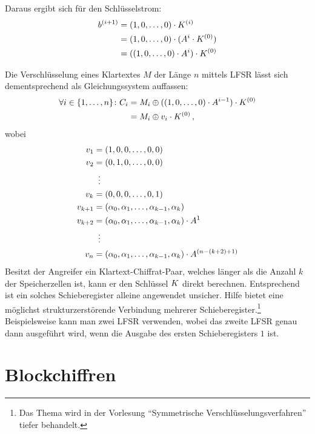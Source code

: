 Daraus ergibt sich für den Schlüsselstrom:
\begin{align*}
  b^{(i+1)} & =  (1,0,\dots,0) \cdot K^{(i)} \\
            & = (1,0,\dots,0) \cdot (A^i \cdot K^{(0)}) \\ 
            & = ((1,0,\dots,0) \cdot A^i) \cdot K^{(0)}
\end{align*}

Die Verschlüsselung eines Klartextes $M$ der Länge $n$ mittels LFSR
lässt sich dementsprechend als Gleichungssystem auffassen: 
\begin{align*}
  \begin{split}
    \forall i \in \{1,\dots,n\} \colon C_i  &= M_i \oplus ((1,0,\dots,0) \cdot A^{i-1}) \cdot K^{(0)}\\
    &= M_i \oplus v_i \cdot K^{(0)} \, \text{,}
  \end{split}
\end{align*}
wobei
\begin{align*}
  v_1 &= (1,0,0,\dots,0,0)\\
  v_2 &= (0,1,0,\dots,0,0)\\
      &\mathrel{\makebox[\widthof{=}]{\vdots}}\\
  v_k &= (0,0,0,\dots,0,1)\\
  v_{k+1} &= (\alpha_0,\alpha_1,\dots,\alpha_{k-1},\alpha_k)\\
  v_{k+2} &= (\alpha_0,\alpha_1,\dots,\alpha_{k-1},\alpha_k) \cdot A^1\\
      &\mathrel{\makebox[\widthof{=}]{\vdots}}\\
  v_n &= (\alpha_0,\alpha_1,\dots,\alpha_{k-1},\alpha_k) \cdot A^{(n-(k+2)+1)}
\end{align*}
Besitzt der Angreifer ein Klartext-Chiffrat-Paar, welches länger als die
Anzahl $k$ der Speicherzellen ist, kann er den Schlüssel $K$ direkt
berechnen. Entsprechend ist ein solches Schieberegister alleine
angewendet unsicher. Hilfe bietet eine möglichst strukturzerstörende
Verbindung mehrerer Schieberegister.\footnote{Das Thema wird in der
  Vorlesung "`Symmetrische Verschlüsselungsverfahren"' tiefer
  behandelt.} Beispielsweise kann man zwei LFSR verwenden, wobei das
zweite LFSR genau dann ausgeführt wird, wenn die Ausgabe des ersten
Schieberegisters $1$ ist. 

\section{Blockchiffren}
\label{sec:blockchiffren}
